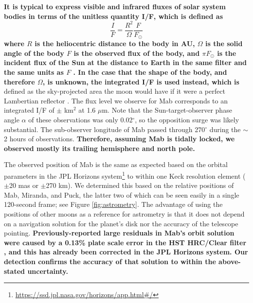 \documentclass[preprint]{aastex631}
\begin{document}
\textbf{It is typical to express visible and infrared fluxes of solar system bodies in terms of the unitless quantity I/F, which is defined as
\begin{equation}
\frac{I}{F} = \frac{R^2}{\Omega} \frac{F}{F_\odot}
\end{equation}
where $R$ is the heliocentric distance to the body in AU, $\Omega$ is the solid angle of the body $F$ is the observed flux of the body, and $\pi F_\odot$ is the incident flux of the Sun at the distance to Earth in the same filter and the same units as $F$ \citep{hammel89}. In the case that the shape of the body, and therefore $\Omega$, is unknown, the integrated I/F is used instead, which is} defined as the sky-projected area the moon would have if it were a perfect Lambertian reflector \citep[i.e., \textbf{an I/F} of unity;][]{karkoschka01}. The flux level we observe for Mab corresponds to an integrated I/F of 
 $\pm$  km$^{2}$ 
at 1.6 $\mu$m. Note that the Sun-target-observer phase angle $\alpha$ of these observations was only 0.02$^\circ$, so the opposition surge was likely substantial. The sub-observer longitude of Mab passed through 270$^\circ$ during the $\sim$2 hours of observations. \textbf{Therefore, assuming Mab is tidally locked, we observed mostly its trailing hemisphere and north pole.}

The observed position of Mab is the same as expected based on the orbital parameters in the JPL Horizons system\footnote{\url{https://ssd.jpl.nasa.gov/horizons/app.html\#/}} to within one Keck resolution element ($\pm$20 mas or $\pm$270 km). We determined this based on the relative positions of Mab, Miranda, and Puck, the latter two of which can be seen easily in a single 120-second frame; see Figure \ref{fig:astrometry}. The advantage of using the positions of other moons as a reference for astrometry is that it does not depend on a navigation solution for the planet's disk nor the accuracy of the telescope pointing. \textbf{Previously-reported large residuals in Mab's orbit solution \citep{showalter06} were caused by a 0.13\% plate scale error in the HST HRC/Clear filter \citep{showalter19}, and this has already been corrected in the JPL Horizons system. Our detection confirms the accuracy of that solution to within the above-stated uncertainty.}
\end{document}
